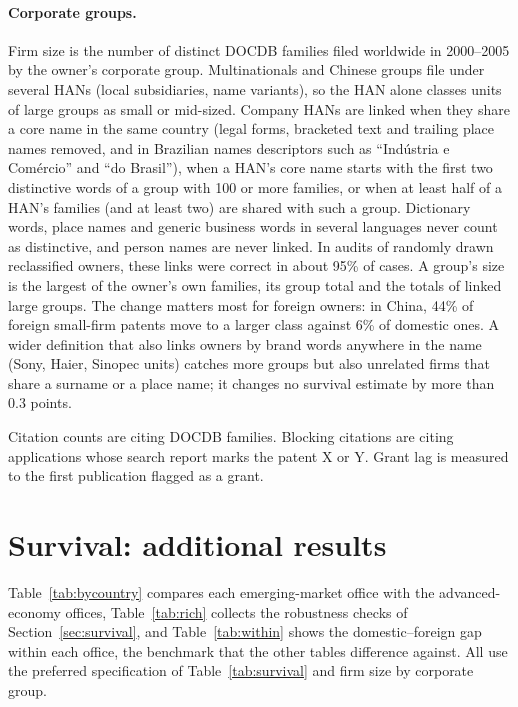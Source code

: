 \paragraph{Corporate groups.} Firm size is the number of distinct DOCDB families filed worldwide in 2000--2005 by the
owner's corporate group. Multinationals and Chinese groups file under several HANs (local subsidiaries, name variants),
so the HAN alone classes units of large groups as small or mid-sized. Company HANs are linked when they share a core
name in the same country (legal forms, bracketed text and trailing place names removed, and in Brazilian names descriptors such as
``Ind\'ustria e Com\'ercio'' and ``do Brasil''), when a HAN's core name starts
with the first two distinctive words of a group with 100 or more families, or when at least half of a HAN's families
(and at least two) are shared with such a group. Dictionary words, place names and generic business words in several
languages never count as distinctive, and person names are never linked. In audits of randomly drawn reclassified
owners, these links were correct in about 95\% of cases. A group's size is the largest of the owner's own families,
its group total and the totals of linked large groups. The change matters most for foreign owners: in China, 44\% of
foreign small-firm patents move to a larger class against 6\% of domestic ones. A wider definition that also links
owners by brand words anywhere in the name (Sony, Haier, Sinopec units) catches more groups but also unrelated firms
that share a surname or a place name; it changes no survival estimate by more than 0.3 points.

Citation counts are citing DOCDB families. Blocking citations are citing applications
whose search report marks the patent X or Y. Grant lag is measured to the first publication flagged as a grant.

\section{Survival: additional results}\label{app:results}

Table~\ref{tab:bycountry} compares each emerging-market office with the advanced-economy offices,
Table~\ref{tab:rich} collects the robustness checks of Section~\ref{sec:survival}, and Table~\ref{tab:within} shows the
domestic--foreign gap within each office, the benchmark that the other tables difference against. All use the
preferred specification of Table~\ref{tab:survival} and firm size by corporate group.


